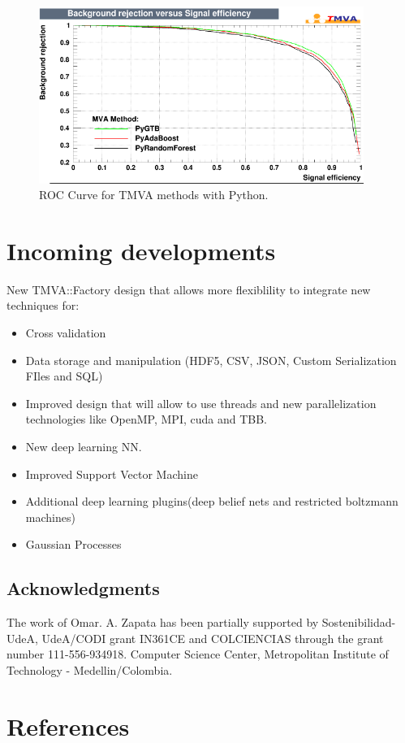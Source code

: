 \documentclass[a4paper]{jpconf}
\begin{document}
\begin{figure}[h]
\centering
\includegraphics[width=25pc]{img/pymvaroc.png}\caption{\label{pymvaroc} ROC Curve for TMVA methods with Python.}
\end{figure}


\section{Incoming developments}
New TMVA::Factory design that allows more flexiblility to
integrate new techniques for:
\begin{itemize}
\item Cross validation
\item Data storage and manipulation (HDF5, CSV, JSON,
Custom Serialization FIles and SQL)
\item Improved design that will allow to use threads and new
parallelization technologies like OpenMP, MPI, cuda and
TBB.
\item New deep learning NN.
\item Improved Support Vector Machine 
\item  Additional deep learning plugins(deep belief nets and
restricted boltzmann machines)
\item Gaussian Processes
\end{itemize}

\subsection{Acknowledgments}
The work of Omar. A. Zapata has been partially supported by Sostenibilidad-UdeA, UdeA/CODI grant IN361CE
and COLCIENCIAS through the grant number 111-556-934918.
Computer Science Center, Metropolitan Institute of Technology - Medellin/Colombia.




\section*{References}

\end{document}
